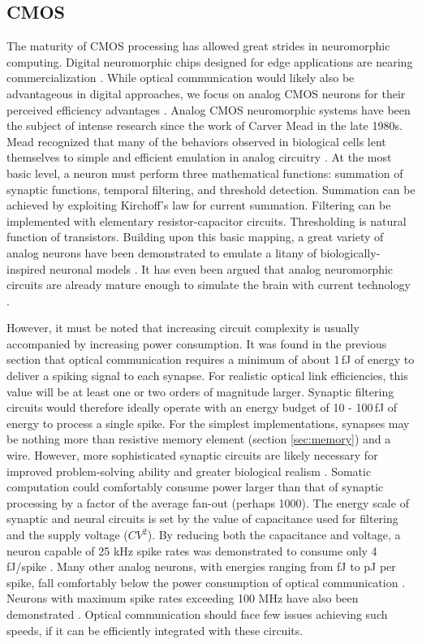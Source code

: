 \documentclass[twocolumn]{article}
\begin{document}
\subsection{CMOS}
The maturity of CMOS processing has allowed great strides in neuromorphic computing. Digital neuromorphic chips designed for edge applications are nearing commercialization \cite{davies2018loihi, merolla2014million}. While optical communication would likely also be advantageous in digital approaches, we focus on analog CMOS neurons for their perceived efficiency advantages \cite{rajendran2012specifications, mead1990neuromorphic}. Analog CMOS neuromorphic systems have been the subject of intense research since the work of Carver Mead in the late 1980s. Mead recognized that many of the behaviors observed in biological cells lent themselves to simple and efficient emulation in analog circuitry \cite{mead1990neuromorphic}. At the most basic level, a neuron must perform three mathematical functions: summation of synaptic functions, temporal filtering, and threshold detection. Summation can be achieved by exploiting Kirchoff's law for current summation. Filtering can be implemented with elementary resistor-capacitor circuits. Thresholding is natural function of transistors. Building upon this basic mapping, a great variety of analog neurons have been demonstrated to emulate a litany of biologically-inspired neuronal models \cite{indiveri2011neuromorphic}. It has even been argued that analog neuromorphic circuits are already mature enough to simulate the brain with current technology \cite{hasler2017special}.

However, it must be noted that increasing circuit complexity is usually accompanied by increasing power consumption. It was found in the previous section that optical communication requires a minimum of about 1\,fJ of energy to deliver a spiking signal to each synapse. For realistic optical link efficiencies, this value will be at least one or two orders of magnitude larger. Synaptic filtering circuits would therefore ideally operate with an energy budget of 10 - 100\,fJ of energy to process a single spike. For the simplest implementations, synapses may be nothing more than resistive memory element (section \ref{sec:memory}) and a wire. However, more sophisticated synaptic circuits are likely necessary for improved problem-solving ability and greater biological realism \cite{chicca2020recipe}. Somatic computation could comfortably consume power larger than that of synaptic processing by a factor of the average fan-out (perhaps 1000). The energy scale of synaptic and neural circuits is set by the value of capacitance used for filtering and the supply voltage ($CV^{2}$). By reducing both the capacitance and voltage, a neuron capable of 25 kHz spike rates was demonstrated to consume only 4\,fJ/spike \cite{sourikopoulos20174}. Many other analog neurons, with energies ranging from fJ to pJ per spike, fall comfortably below the power consumption of optical communication \cite{indiveri2019importance}. Neurons with maximum spike rates exceeding 100 MHz have also been demonstrated \cite{schemmel2020accelerated}. Optical communication should face few issues achieving such speeds, if it can be efficiently integrated with these circuits.
\end{document}
